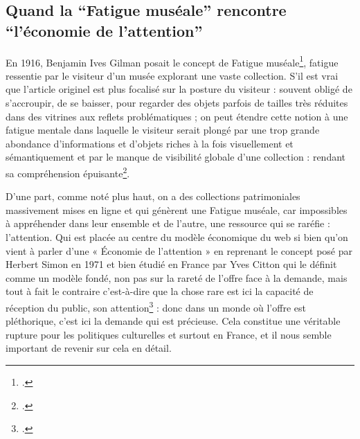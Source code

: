 \subsection{Quand la \enquote{Fatigue muséale} rencontre \enquote{l'économie de l'attention}}

En 1916, Benjamin Ives Gilman posait le concept de Fatigue muséale\footcite{gilman_museum_1916}, fatigue ressentie par le visiteur d’un musée explorant une vaste collection. S’il est vrai que l’article originel est plus focalisé sur la posture du visiteur : souvent obligé de s’accroupir, de se baisser, pour regarder des objets parfois de tailles très réduites dans des vitrines aux reflets problématiques ; on peut étendre cette notion à une fatigue mentale dans laquelle le visiteur serait plongé par une trop grande abondance d’informations et d’objets riches à la fois visuellement et sémantiquement et par le manque de visibilité globale d’une collection : rendant sa compréhension épuisante\footcite[pp. 1-2]{windhager2018a}. 

D’une part, comme noté plus haut, on a des collections patrimoniales massivement mises en ligne et qui génèrent une Fatigue muséale, car impossibles à appréhender dans leur ensemble et de l’autre, une ressource qui se raréfie : l’attention. Qui est placée au centre du modèle économique du web si bien qu’on vient à parler d’une « Économie de l’attention » en reprenant le concept posé par Herbert Simon en 1971 et bien étudié en France par Yves Citton qui le définit comme un modèle fondé, non pas sur la rareté de l’offre face à la demande, mais tout à fait le contraire c’est-à-dire que la chose rare est ici la capacité de réception du public, son attention\footcite[Citton Yves, \enquote{pour une écologie de l’attention}, Paris, Seuil, 2014, p. 16 \textit{in}]{durand2016} : donc dans un monde où l’offre est pléthorique, c’est ici la demande qui est précieuse. Cela constitue une véritable rupture pour les politiques culturelles et surtout en France, et il nous semble important de revenir sur cela en détail. 


